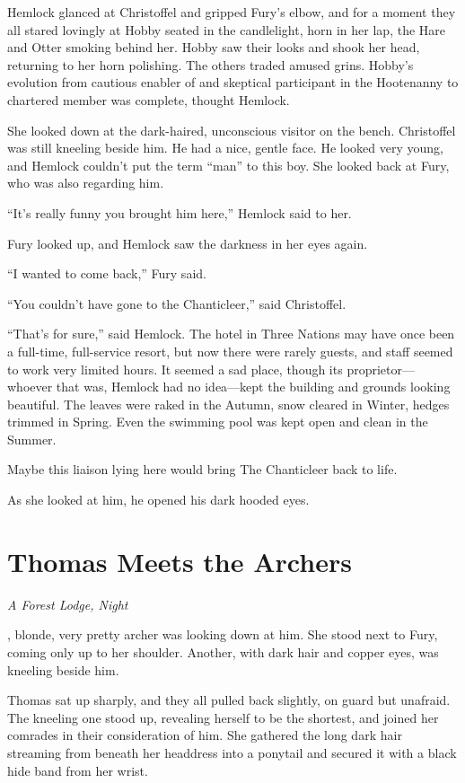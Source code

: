 \documentclass[11pt,a5paper]{article}
\newcommand{\alet}[1]{\textit{#1}\vspace{1em}}
\begin{document}
Hemlock glanced at Christoffel and gripped Fury's elbow, and for a moment they all stared lovingly at Hobby seated in the candlelight, horn in her lap, the Hare and Otter smoking behind her. Hobby saw their looks and shook her head, returning to her horn polishing. The others traded amused grins. Hobby's evolution from cautious enabler of and skeptical participant in the Hootenanny to chartered member was complete, thought Hemlock.

She looked down at the dark-haired, unconscious visitor on the bench. Christoffel was still kneeling beside him. He had a nice, gentle face. He looked very young, and Hemlock couldn't put the term ``man'' to this boy. She looked back at Fury, who was also regarding him.

``It's really funny you brought him here,'' Hemlock said to her.

Fury looked up, and Hemlock saw the darkness in her eyes again.

``I wanted to come back,'' Fury said.

``You couldn't have gone to the Chanticleer,'' said Christoffel.

``That's for sure,'' said Hemlock. The hotel in Three Nations may have once been a full-time, full-service resort, but now there were rarely guests, and staff seemed to work very limited hours. It seemed a sad place, though its proprietor---whoever that was, Hemlock had no idea---kept the building and grounds looking beautiful. The leaves were raked in the Autumn, snow cleared in Winter, hedges trimmed in Spring. Even the swimming pool was kept open and clean in the Summer.

Maybe this liaison lying here would bring The Chanticleer back to life.

As she looked at him, he opened his dark hooded eyes.

\newpage

\section{Thomas Meets the Archers}

\alet{A Forest Lodge, Night}

, blonde, very pretty archer was looking down at him. She stood next to Fury, coming only up to her shoulder. Another, with dark hair and copper eyes, was kneeling beside him.

Thomas sat up sharply, and they all pulled back slightly, on guard but unafraid. The kneeling one stood up, revealing herself to be the shortest, and joined her comrades in their consideration of him. She gathered the long dark hair streaming from beneath her headdress into a ponytail and secured it with a black hide band from her wrist.
\end{document}
